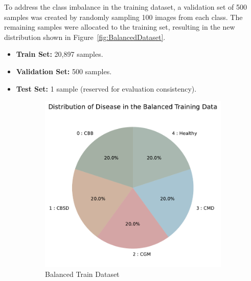 To address the class imbalance in the training dataset, a validation set of 500 samples was created by randomly sampling 100 images from each class.
The remaining samples were allocated to the training set, resulting in the new distribution shown in Figure~\ref{fig:BalancedDataset}.

\begin{itemize}
    \item \textbf{Train Set:} 20,897 samples.
    \item \textbf{Validation Set:} 500 samples.
    \item \textbf{Test Set:} 1 sample (reserved for evaluation consistency).
\end{itemize}

\begin{figure}[t]
    \centering
    \begin{subfigure}{0.4\textwidth}
        \centering
        \includegraphics[width=\linewidth]{graphs/overview/Distribution of Disease in the Balanced Training Data.pdf}
        \caption{Balanced Train Dataset}
        \label{fig:BalancedTrain}
    \end{subfigure}
    \begin{subfigure}{0.4\textwidth}
        \centering

\end{subfigure}
\end{figure}
